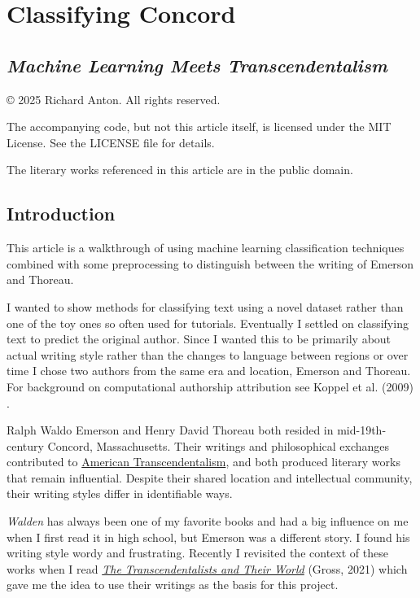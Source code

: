 \documentclass[
]{article}
\author{}
\date{}
\begin{document}
\section{Classifying Concord}
\subsection{
\emph{Machine Learning Meets Transcendentalism}
}

\label{classifying-concord-machine-learning-meets-transcendentalism}

© 2025 Richard Anton. All rights reserved.

The accompanying code, but not this article itself, is licensed under the
MIT License. See the LICENSE file for details.

The literary works referenced in this article are in the public domain.

\subsection{Introduction}\label{introduction}

This article is a walkthrough of using machine learning classification
techniques combined with some preprocessing to distinguish between the
writing of Emerson and Thoreau.

I wanted to show methods for classifying text using a novel dataset
rather than one of the toy ones so often used for tutorials. Eventually
I settled on classifying text to predict the original author. Since I
wanted this to be primarily about actual writing style rather than the
changes to language between regions or over time I chose two authors
from the same era and location, Emerson and Thoreau. For background on
computational authorship attribution see Koppel et al. (2009) .

Ralph Waldo Emerson and Henry David Thoreau both resided in
mid-19th-century Concord, Massachusetts. Their writings and
philosophical exchanges contributed to
\href{https://plato.stanford.edu/entries/transcendentalism/}{American
Transcendentalism}, and both produced literary works that remain
influential. Despite their shared location and intellectual community,
their writing styles differ in identifiable ways.

\emph{Walden} has always been one of my favorite books and had a big
influence on me when I first read it in high school, but Emerson was a
different story. I found his writing style wordy and frustrating.
Recently I revisited the context of these works when I read
\emph{\href{https://us.macmillan.com/books/9780374279325/thetranscendentalistsandtheirworld/}{The
Transcendentalists and Their World}} (Gross, 2021) which gave me the
idea to use their writings as the basis for this project.
\end{document}
